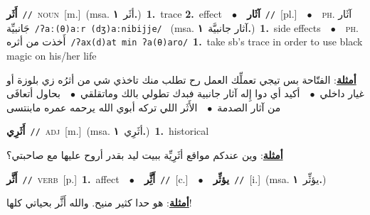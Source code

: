 \documentclass[10pt,a4paper,twoside]{article} %
\begin{document}
\begin{multicols}{2}
{\setlength\topsep{0pt}\textbf{\foreignlanguage{arabic}{أَثَر}}\ {\color{gray}\texttt{//}\color{black}}\ \textsc{noun}\ [m.]\ \color{gray}(msa. \foreignlanguage{arabic}{أثَر}~\foreignlanguage{arabic}{\textbf{١.}})\color{black}\ \textbf{1.}~trace  \textbf{2.}~effect\ \ $\bullet$\ \ \setlength\topsep{0pt}\textbf{\foreignlanguage{arabic}{آثَار}}\ {\color{gray}\texttt{//}\color{black}}\ [pl.]\ \ $\bullet$\ \ \textsc{ph.} \color{gray} \foreignlanguage{arabic}{آثَار جَانبيِّة}\color{black}\ {\color{gray}\texttt{/{\sffamily ʔaː(θ)aːr (dʒ)aːnibijje}/}\color{black}}\ \color{gray} (msa. \foreignlanguage{arabic}{آثار جانبيَّة}~\foreignlanguage{arabic}{\textbf{١.}})\color{black}\ \textbf{1.}~side effects\ \ $\bullet$\ \ \textsc{ph.} \color{gray} \foreignlanguage{arabic}{أَخذت من أثره}\color{black}\ {\color{gray}\texttt{/{\sffamily ʔax(d)at min ʔa(θ)aro}/}\color{black}}\ \textbf{1.}~take sb's trace in order to use black magic on his/her life\  \begin{flushright}\color{gray}\foreignlanguage{arabic}{\textbf{\underline{\foreignlanguage{arabic}{أمثلة}}}: الفتّاحة بس تيجي تعملِّك العمل رح تطلب منك تاخذي شي من أثرُه زي بلوزة أو غيار داخلي\ $\bullet$\ \  أكيد أي دوا إِله آثار جانبية فبدك تطولي بالك وماتقلقي\ $\bullet$\ \  بحاول أتعافَى من آثار الصدمة\ $\bullet$\ \  الأَثَر اللي تركه أبوي الله يرحمه عمره مابنتسى}\end{flushright}\color{black}} \vspace{2mm}

{\setlength\topsep{0pt}\textbf{\foreignlanguage{arabic}{أَثَرِي}}\ {\color{gray}\texttt{//}\color{black}}\ \textsc{adj}\ [m.]\ \color{gray}(msa. \foreignlanguage{arabic}{أثَرِي}~\foreignlanguage{arabic}{\textbf{١.}})\color{black}\ \textbf{1.}~historical\  \begin{flushright}\color{gray}\foreignlanguage{arabic}{\textbf{\underline{\foreignlanguage{arabic}{أمثلة}}}: وين عندكم مواقع أثَرِيِّة ببيت ليد بقدر أروح عليها مع صاحبتي؟}\end{flushright}\color{black}} \vspace{2mm}

{\setlength\topsep{0pt}\textbf{\foreignlanguage{arabic}{أَثَّر}}\ {\color{gray}\texttt{//}\color{black}}\ \textsc{verb}\ [p.]\ \textbf{1.}~affect\ \ $\bullet$\ \ \setlength\topsep{0pt}\textbf{\foreignlanguage{arabic}{أَثَِّر}}\ {\color{gray}\texttt{//}\color{black}}\ [c.]\ \ $\bullet$\ \ \setlength\topsep{0pt}\textbf{\foreignlanguage{arabic}{يؤثِّر}}\ {\color{gray}\texttt{//}\color{black}}\ [i.]\ \color{gray}(msa. \foreignlanguage{arabic}{يؤثِّر}~\foreignlanguage{arabic}{\textbf{١.}})\color{black}\  \begin{flushright}\color{gray}\foreignlanguage{arabic}{\textbf{\underline{\foreignlanguage{arabic}{أمثلة}}}: هو حدا كثير منيح. والله أَثَّر بحياتي كلها!}\end{flushright}\color{black}} \vspace{2mm}


\end{multicols}
\end{document}
